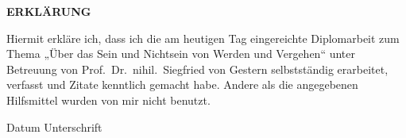 \documentclass{scrbook}
\begin{document}
\backmatter

\printbibliography{}

\printindex

\cleardoublepage

\thispagestyle{empty}

\hbox{}\vfill

\textbf{\large ERKLÄRUNG}

\bigskip \medskip

Hiermit erkläre ich, dass ich die am heutigen Tag eingereichte Diplomarbeit zum
Thema „Über das Sein und Nichtsein von Werden und Vergehen“ unter Betreuung von
Prof.~Dr.~nihil.~Siegfried von Gestern selbstständig erarbeitet, verfasst und
Zitate kenntlich gemacht habe. Andere als die angegebenen Hilfsmittel wurden von
mir nicht benutzt.

\vspace*{5\bigskipamount}

Datum \hfill Unterschrift

\normalsize

\vspace*{2\bigskipamount}

\vfill\hbox{}
\end{document}
